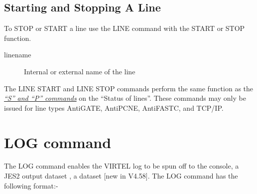 \documentclass[letterpaper,10pt,english]{sphinxmanual}
\begin{document}
\ignorespaces 

\subsection{Starting and Stopping A Line}
\label{\detokenize{audit_operations_ and_performance:starting-and-stopping-a-line}}\label{\detokenize{audit_operations_ and_performance:index-7}}
To STOP or START a line use the LINE command with the START or STOP function.

\begin{sphinxVerbatim}[commandchars=\\\{\}]
  


  
\end{sphinxVerbatim}
\begin{description}
\item[{linename}] \leavevmode
Internal or external name of the line

\end{description}

The LINE START and LINE STOP commands perform the same function as the {\hyperref[\detokenize{audit_operations_ and_performance:_bookmark12}]{\emph{“S” and “P” commands}}} on the “Status of lines”. These commands may only be issued for line types AntiGATE, AntiPCNE, AntiFASTC, and TCP/IP.

\ignorespaces 

\section{LOG command}
\label{\detokenize{audit_operations_ and_performance:log-command}}\label{\detokenize{audit_operations_ and_performance:index-8}}
The LOG command enables the VIRTEL log to be spun off to the console, a JES2 output dataset , a dataset {[}new in V4.58{]}. The LOG command has the following format:-

\begin{sphinxVerbatim}[commandchars=\\\{\}]
         
\end{sphinxVerbatim}
\end{document}
